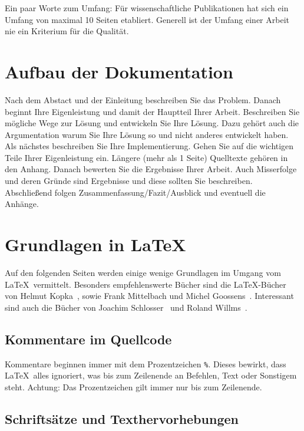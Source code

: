 \documentclass{llncs}
\begin{document}
Ein paar Worte zum Umfang: Für wissenschaftliche Publikationen hat sich ein Umfang von maximal 10 Seiten etabliert. Generell ist der Umfang einer Arbeit nie ein Kriterium für die Qualität.

\section{Aufbau der Dokumentation}

Nach dem Abstact und der Einleitung beschreiben Sie das Problem. 
Danach beginnt Ihre Eigenleistung und damit der Hauptteil Ihrer Arbeit. Beschreiben Sie mögliche Wege zur Lösung und entwickeln Sie Ihre Lösung. Dazu gehört auch die Argumentation warum Sie Ihre Lösung so und nicht anderes entwickelt haben. Als nächstes beschreiben Sie Ihre Implementierung. Gehen Sie auf die wichtigen Teile Ihrer Eigenleistung ein. Längere (mehr als 1 Seite) Quelltexte gehören in den Anhang. Danach bewerten Sie die Ergebnisse Ihrer Arbeit. Auch Misserfolge und deren Gründe sind Ergebnisse und diese sollten Sie beschreiben. 
Abschließend folgen Zusammenfassung/Fazit/Ausblick und eventuell die Anhänge. 

\section{Grundlagen in \LaTeX}

Auf den folgenden Seiten werden einige wenige Grundlagen im Umgang vom \LaTeX\ vermittelt. Besonders empfehlenswerte Bücher sind die \LaTeX-Bücher von Helmut Kopka~\cite{LaTeXKopka1}\cite{LaTeXKopka2}\cite{LaTeXKopka3}, sowie Frank Mittelbach und Michel Goossens~\cite{LaTeXBegleiter}. Interessant sind auch die Bücher von Joachim Schlosser~\cite{LaTeXWissenschaftlich} und Roland Willms~\cite{LaTeXSchnelleinsteiger}.

\subsection{Kommentare im Quellcode}

Kommentare beginnen immer mit dem Prozentzeichen \verb!%!. Dieses bewirkt, dass \LaTeX\ alles ignoriert, was bis zum Zeilenende an Befehlen, Text oder Sonstigem steht. Achtung: Das Prozentzeichen gilt immer nur bis zum Zeilenende.

\subsection{Schriftsätze und Texthervorhebungen}
\end{document}

